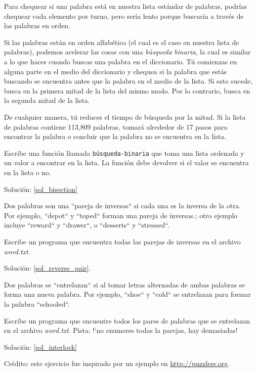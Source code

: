 \begin{exercise}
\label{bisection}

Para chequear si una palabra está en nuestra lista 
estándar de palabras, podrías chequear cada elemento
por turno, pero sería lento porque buscaría a través 
de las palabras en orden.

Si las palabras están en orden alfabético (el cual es
el caso en nuestra lista de palabras), podemos 
acelerar las cosas con una \emph{búsqueda binaria},
la cual es similar a lo que haces cuando buscas una
palabra en el diccionario. Tú comienzas en alguna parte
en el medio del diccionario y chequea si la palabra que
estás buscando se encuentra antes que la palabra en
el medio de la lista. Si esto sucede, busca en la 
primera mitad de la lista del mismo modo. Por lo
contrario, busca en la segunda mitad de la lista.

De cualquier manera, tú reduces el tiempo de búsqueda
por la mitad. Si la lista de palabras contiene 113,809 
palabras, tomará alrededor de 17 pasos para encontrar la 
palabra o concluir que la palabra no se encuentra en 
la lista.

Escribe una función llamada \verb|búsqueda-binaria|
que toma una lista ordenada y un valor a encontrar en
la lista. La función debe devolver si el valor
se encuentra en la lista o no.

Solución: \ref{sol_bisection}

\end{exercise}

\begin{exercise}
\label{reverse_pair}

Dos palabras son una ``pareja de inversas`` si cada una es la
inversa de la otra. Por ejemplo, ``depot`` y ``toped`` forman
una pareja de inversas.; otro ejemplo incluye ``reward`` y ``drawer``,
o ``desserts`` y ``stressed``.

Escribe un programa que encuentra todas las parejas de inversas en 
el archivo \emph{word.txt}.


Solución: \ref{sol_reverse_pair}.

\end{exercise}

\begin{exercise}
\label{interlock}

Dos palabras se ``entrelazan`` si al tomar letras alternadas de
ambas palabras se forma una nueva palabra. Por ejemplo, ``shoe``
y ``cold`` se entrelazan para formar la palabra ``schooled``.

Escribe un programa que encuentre todos los pares de palabras
que se entrelazan en el archivo \emph{word.txt}.
Pista: !`no enumeres todas la parejas, hay demasiadas!

Solución: \ref{sol_interlock}

Crédito: este ejercicio fue inspirado por un ejemplo en \url{http://puzzlers.org}.

\end{exercise}


